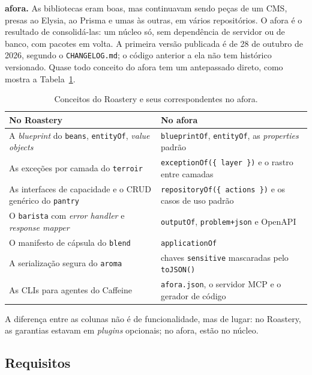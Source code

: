 \documentclass[a4paper,12pt]{article}
\newcommand{\fonte}[1]{\par\vspace{2pt}{\centering\sffamily\footnotesize Fonte: #1\par}}
\newcommand{\estr}[1]{\textit{#1}}
\begin{document}
\textbf{afora.} As bibliotecas eram boas, mas continuavam sendo peças de um CMS, presas ao Elysia, ao Prisma e umas às outras, em vários repositórios. O afora é o resultado de consolidá-las: um núcleo só, sem dependência de servidor ou de banco, com pacotes em volta. A primeira versão publicada é de 28 de outubro de 2026, segundo o \texttt{CHANGELOG.md}; o código anterior a ela não tem histórico versionado. Quase todo conceito do afora tem um antepassado direto, como mostra a Tabela~\ref{tab:conceitos}.

\begin{table}[ht]
\centering
\caption{Conceitos do Roastery e seus correspondentes no afora.}\label{tab:conceitos}
\small
\renewcommand{\arraystretch}{1.15}
\begin{tabularx}{\linewidth}{>{\raggedright\arraybackslash}X>{\raggedright\arraybackslash}X}
\toprule
No Roastery & No afora \\
\midrule
A \estr{blueprint} do \texttt{beans}, \texttt{entityOf}, \estr{value objects} & \texttt{blueprintOf}, \texttt{entityOf}, as \estr{properties} padrão \\
As exceções por camada do \texttt{terroir} & \texttt{exceptionOf(\{ layer \})} e o rastro entre camadas \\
As interfaces de capacidade e o CRUD genérico do \texttt{pantry} & \texttt{repositoryOf(\{ actions \})} e os casos de uso padrão \\
O \texttt{barista} com \estr{error handler} e \estr{response mapper} & \texttt{outputOf}, \texttt{problem+json} e OpenAPI \\
O manifesto de cápsula do \texttt{blend} & \texttt{applicationOf} \\
A serialização segura do \texttt{aroma} & chaves \texttt{sensitive} mascaradas pelo \texttt{toJSON()} \\
As CLIs para agentes do Caffeine & \texttt{afora.json}, o servidor MCP e o gerador de código \\
\bottomrule
\end{tabularx}
\fonte{elaborado pelo autor (2026).}
\end{table}

A diferença entre as colunas não é de funcionalidade, mas de lugar: no Roastery, as garantias estavam em \estr{plugins} opcionais; no afora, estão no núcleo.

\subsection{Requisitos}
\end{document}
